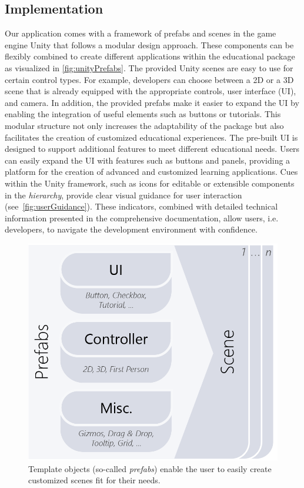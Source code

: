 \subsection{Implementation}

Our application comes with a framework of prefabs and scenes in the game engine Unity that follows a modular design approach. These components can be flexibly combined to create different applications within the educational package as visualized in \autoref{fig:unityPrefabs}. The provided Unity scenes are easy to use for certain control types. For example, developers can choose between a 2D or a 3D scene that is already equipped with the appropriate controls, user interface (UI), and camera. In addition, the provided prefabs make it easier to expand the UI by enabling the integration of useful elements such as buttons or tutorials. This modular structure not only increases the adaptability of the package but also facilitates the creation of customized educational experiences.
The pre-built UI is designed to support additional features to meet different educational needs. Users can easily expand the UI with features such as buttons and panels, providing a platform for the creation of advanced and customized learning applications.
Cues within the Unity framework, such as icons for editable or extensible components in the \emph{hierarchy}, provide clear visual guidance for user interaction (see~\autoref{fig:userGuidance}). These indicators, combined with detailed technical information presented in the comprehensive documentation, allow users, i.e. developers, to navigate the development environment with confidence.

\begin{figure}[h!tb]
	\centering
	\includegraphics[width=0.6\linewidth]{pictures/unityPrefabs.png}
	\captionsetup{labelfont=bf,textfont=it}
	\caption{Template objects (so-called \emph{prefabs}) enable the user to easily create customized scenes fit for their needs. \label{fig:unityPrefabs}}
\end{figure}

